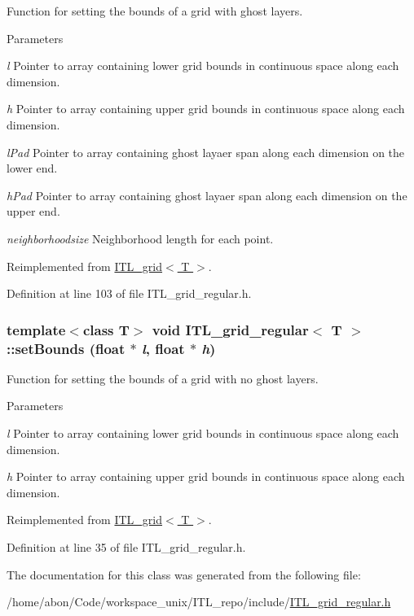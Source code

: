 Function for setting the bounds of a grid with ghost layers. 


\begin{DoxyParams}{Parameters}
\item[{\em l}]Pointer to array containing lower grid bounds in continuous space along each dimension. \item[{\em h}]Pointer to array containing upper grid bounds in continuous space along each dimension. \item[{\em lPad}]Pointer to array containing ghost layaer span along each dimension on the lower end. \item[{\em hPad}]Pointer to array containing ghost layaer span along each dimension on the upper end. \item[{\em neighborhoodsize}]Neighborhood length for each point. \end{DoxyParams}


Reimplemented from \hyperlink{classITL__grid_adf6baf011a2d80f49a7e6007bcd190c7}{ITL\_\-grid$<$ T $>$}.



Definition at line 103 of file ITL\_\-grid\_\-regular.h.

\hypertarget{classITL__grid__regular_aae7fcdd0c0da2df91cbe6b658a7ce43c}{
\subsubsection[{setBounds}]{\setlength{\rightskip}{0pt plus 5cm}template$<$class T$>$ void {\bf ITL\_\-grid\_\-regular}$<$ T $>$::setBounds (float $\ast$ {\em l}, \/  float $\ast$ {\em h})}}
\label{classITL__grid__regular_aae7fcdd0c0da2df91cbe6b658a7ce43c}


Function for setting the bounds of a grid with no ghost layers. 


\begin{DoxyParams}{Parameters}
\item[{\em l}]Pointer to array containing lower grid bounds in continuous space along each dimension. \item[{\em h}]Pointer to array containing upper grid bounds in continuous space along each dimension. \end{DoxyParams}


Reimplemented from \hyperlink{classITL__grid_a808e49a6b0fe44a13f80df372146ce13}{ITL\_\-grid$<$ T $>$}.



Definition at line 35 of file ITL\_\-grid\_\-regular.h.



The documentation for this class was generated from the following file:\begin{DoxyCompactItemize}
\item 
/home/abon/Code/workspace\_\-unix/ITL\_\-repo/include/\hyperlink{ITL__grid__regular_8h}{ITL\_\-grid\_\-regular.h}\end{DoxyCompactItemize}
